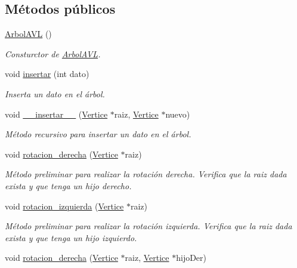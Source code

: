 \subsection*{Métodos públicos}
\begin{DoxyCompactItemize}
\item 
\mbox{\label{classArbolAVL_afd1b81c0fb7bd76fc8b924f15ca7e926}} 
\hyperlink{classArbolAVL_afd1b81c0fb7bd76fc8b924f15ca7e926}{Arbol\+A\+VL} ()
\begin{DoxyCompactList}\small\item\em Consturctor de \hyperlink{classArbolAVL}{Arbol\+A\+VL}. \end{DoxyCompactList}\item 
void \hyperlink{classArbolAVL_a99512878bc14c77bf31ab7bf8dd6aa36}{insertar} (int dato)
\begin{DoxyCompactList}\small\item\em Inserta un dato en el árbol. \end{DoxyCompactList}\item 
void \hyperlink{classArbolAVL_ac88b4af2e6b96775793a981baba0763a}{\+\_\+\+\_\+insertar\+\_\+\+\_\+} (\hyperlink{classVertice}{Vertice} $\ast$raiz, \hyperlink{classVertice}{Vertice} $\ast$nuevo)
\begin{DoxyCompactList}\small\item\em Método recursivo para insertar un dato en el árbol. \end{DoxyCompactList}\item 
void \hyperlink{classArbolAVL_a498e8df16b6814ea1dad6bcdf274dc3f}{rotacion\+\_\+derecha} (\hyperlink{classVertice}{Vertice} $\ast$raiz)
\begin{DoxyCompactList}\small\item\em Método preliminar para realizar la rotación derecha. Verifica que la raiz dada exista y que tenga un hijo derecho. \end{DoxyCompactList}\item 
void \hyperlink{classArbolAVL_aedfb7658eb4f826aeba3fb98f50483e6}{rotacion\+\_\+izquierda} (\hyperlink{classVertice}{Vertice} $\ast$raiz)
\begin{DoxyCompactList}\small\item\em Método preliminar para realizar la rotación izquierda. Verifica que la raiz dada exista y que tenga un hijo izquierdo. \end{DoxyCompactList}\item 
void \hyperlink{classArbolAVL_a33dfba0b6e53caa0f2e4b71a8d2c6a7e}{rotacion\+\_\+derecha} (\hyperlink{classVertice}{Vertice} $\ast$raiz, \hyperlink{classVertice}{Vertice} $\ast$hijo\+Der)

\end{DoxyCompactItemize}
